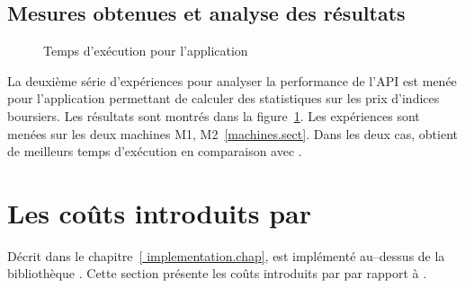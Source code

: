 \subsection{Mesures obtenues et analyse des r\'esultats}


\mydata

\begin{figure}[H]
\centering
    \caption{Temps d'ex\'ecution pour l'application }
    \label{executionTimesStockPrice.fig}
\end{figure}


La deuxi\`eme s\'erie d'exp\'eriences pour analyser la performance de l'API est men\'ee pour l'application permettant de calculer des statistiques sur les prix d'indices boursiers. Les r\'esultats sont montr\'es dans la figure~\ref{executionTimesStockPrice.fig}. Les expériences sont menées sur les deux machines M1, M2~\ref{machines.sect}. Dans les deux cas,  obtient de meilleurs temps d'ex\'ecution en comparaison avec .


\section{Les co\^uts introduits par }
\label{coutsPpFf.sect}

D\'ecrit dans le chapitre~\ref{ implementation.chap},  est impl\'ement\'e au--dessus de la biblioth\`eque . Cette section pr\'esente les co\^uts introduits par  par rapport \`a . 


